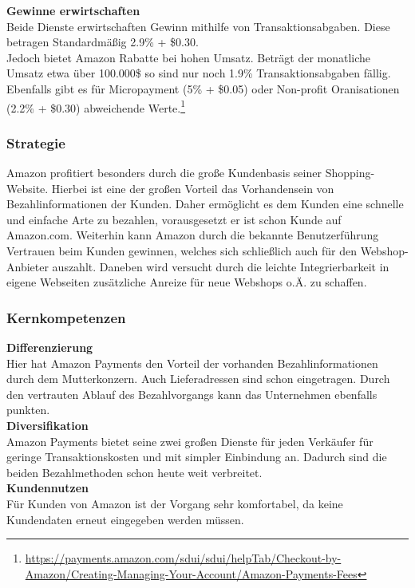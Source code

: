 \textbf{Gewinne erwirtschaften}\\
Beide Dienste erwirtschaften Gewinn mithilfe von Transaktionsabgaben. Diese betragen Standardmäßig 2.9\% + \$0.30.\\
Jedoch bietet Amazon Rabatte bei hohen Umsatz. Beträgt der monatliche Umsatz etwa über 100.000\$ so sind nur noch 1.9\%  Transaktionsabgaben fällig.
Ebenfalls gibt es für Micropayment (5\% + \$0.05) oder Non-profit Oranisationen (2.2\% + \$0.30) abweichende Werte.\footnote{\url{https://payments.amazon.com/sdui/sdui/helpTab/Checkout-by-Amazon/Creating-Managing-Your-Account/Amazon-Payments-Fees}}

\subsubsection{Strategie}
Amazon profitiert besonders durch die große Kundenbasis seiner Shopping-Website. Hierbei ist eine der großen Vorteil das Vorhandensein von Bezahlinformationen der Kunden. Daher ermöglicht es dem Kunden eine schnelle und einfache Arte zu bezahlen, vorausgesetzt er ist schon Kunde auf Amazon.com. Weiterhin kann Amazon durch die bekannte Benutzerführung Vertrauen beim Kunden gewinnen, welches sich schließlich auch für den Webshop-Anbieter auszahlt. Daneben wird versucht durch die leichte Integrierbarkeit in eigene Webseiten zusätzliche Anreize für neue Webshops o.Ä. zu schaffen. 

\subsubsection{Kernkompetenzen}
\textbf{Differenzierung}\\
Hier hat Amazon Payments den Vorteil der vorhanden Bezahlinformationen durch dem Mutterkonzern. Auch Lieferadressen sind schon eingetragen. Durch den vertrauten Ablauf des Bezahlvorgangs kann das Unternehmen ebenfalls punkten.\\

\textbf{Diversifikation}\\
Amazon Payments bietet seine zwei großen Dienste für jeden Verkäufer für geringe Transaktionskosten und mit simpler Einbindung an. Dadurch sind die beiden Bezahlmethoden schon heute weit verbreitet.\\

\textbf{Kundennutzen}\\
Für Kunden von Amazon ist der Vorgang sehr komfortabel, da keine Kundendaten erneut eingegeben werden müssen.\\